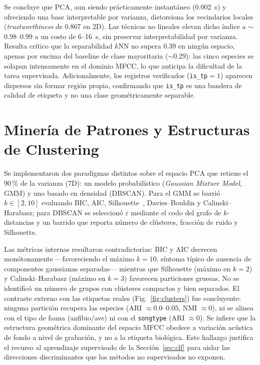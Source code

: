 \documentclass[conference]{IEEEtran}
\begin{document}
Se concluye que PCA, aun siendo prácticamente instantáneo (0{.}002~s) y ofreciendo
una base interpretable por varianza, distorsiona los vecindarios locales
(\emph{trustworthiness} de 0{.}867 en 2D). Las técnicas no lineales elevan dicho
índice a $\sim$0{.}98--0{.}99 a un costo de 6--16~s, sin preservar interpretabilidad
por varianza. Resulta crítico que la separabilidad $k$NN no supera 0{.}39 en ningún
espacio, apenas por encima del baseline de clase mayoritaria ($\sim$0{.}29): las
cinco especies se solapan intensamente en el dominio MFCC, lo que anticipa la
dificultad de la tarea supervisada. Adicionalmente, los registros verificados
(\texttt{is\_tp}$=1$) aparecen dispersos sin formar región propia, confirmando que
\texttt{is\_tp} es una bandera de calidad de etiqueta y no una clase geométricamente
separable.

\section{Minería de Patrones y Estructuras de Clustering}

Se implementaron dos paradigmas distintos sobre el espacio PCA que retiene el 90\,\%
de la varianza (7D): un modelo probabilístico (\emph{Gaussian Mixture Model}, GMM) y
uno basado en densidad (DBSCAN). Para el GMM se barrió $k \in [2,10]$ evaluando BIC,
AIC, Silhouette~\cite{silhouette}, Davies--Bouldin y Calinski--Harabasz; para DBSCAN se seleccionó
$\varepsilon$ mediante el codo del grafo de $k$-distancias y un barrido que reporta
número de clústeres, fracción de ruido y Silhouette.

Las métricas internas resultaron contradictorias: BIC y AIC decrecen monótonamente
---favoreciendo el máximo $k=10$, síntoma típico de ausencia de componentes
gaussianas separadas--- mientras que Silhouette (máximo en $k=2$) y
Calinski--Harabasz (máximo en $k=3$) favorecen particiones gruesas. No se identificó
un número de grupos con clústeres compactos y bien separados. El contraste externo
con las etiquetas reales (Fig.~\ref{fig:clusters}) fue concluyente: ninguna partición
recupera las especies (ARI $\approx 0{.}0$--$0{.}05$, NMI $\approx 0$), ni se alinea
con el tipo de fauna (anfibio/ave) ni con el \texttt{songtype} (ARI $\approx 0$). Se
infiere que la estructura geométrica dominante del espacio MFCC obedece a variación
acústica de fondo a nivel de grabación, y no a la etiqueta biológica. Este hallazgo
justifica el recurso al aprendizaje supervisado de la Sección~\ref{sec:clf} para
aislar las direcciones discriminantes que los métodos no supervisados no exponen.
\end{document}
